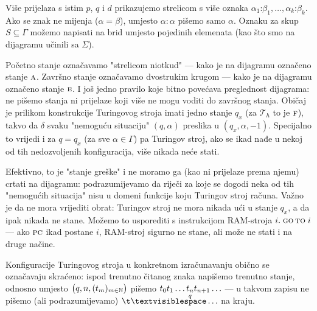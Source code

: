 \begin{primjer}[{name=[funkcija koja riječi parne duljine preslikava u prvu polovicu]}]
Više prijelaza s istim $p$, $q$ i $d$ prikazujemo strelicom s više oznaka $\alpha_1\mathord:\beta_1,\dotsc,\alpha_k\mathord:\beta_k$. Ako se znak ne mijenja ($\alpha=\beta$), umjesto $\alpha\!:\!\alpha$ pišemo samo $\alpha$. Oznaku za skup $S\subseteq\Gamma$ možemo napisati na brid umjesto pojedinih elemenata (kao što smo na dijagramu učinili sa $\Sigma$).

    Početno stanje označavamo "strelicom niotkud" --- kako je na dijagramu označeno stanje $\textsc a$. Završno stanje označavamo dvostrukim krugom --- kako je na dijagramu označeno stanje $\textsc e$. I još jedno pravilo koje bitno povećava preglednost dijagrama: ne pišemo stanja ni prijelaze koji više ne mogu voditi do završnog stanja. Običaj je prilikom konstrukcije Turingovog stroja imati jedno stanje $q_x$ (za $\mathcal T_h$ to je $\textsc f$), takvo da $\delta$ svaku "nemoguću situaciju" $(q,\alpha)$ preslika u $(q_x,\alpha,-1)$. Specijalno to vrijedi i za $q=q_x$ (za sve $\alpha\in\Gamma$) pa Turingov stroj, ako se ikad nađe u nekoj od tih nedozvoljenih konfiguracija, više nikada neće stati.

    Efektivno, to je "stanje greške" i ne moramo ga (kao ni prijelaze prema njemu) crtati na dijagramu: podrazumijevamo da riječi za koje se dogodi neka od tih "nemogućih situacija" nisu u domeni funkcije koju Turingov stroj računa. Važno je da ne mora vrijediti obrat: Turingov stroj ne mora nikada ući u stanje $q_x$, a da ipak nikada ne stane. Možemo to usporediti s instrukcijom RAM-stroja $i.\;\textsc{go\,to}\;i$ --- ako $\textsc{pc}$ ikad postane $i$, RAM-stroj sigurno ne stane, ali može ne stati i na druge načine.

    Konfiguracije Turingovog stroja u konkretnom izračunavanju obično se označavaju skraćeno: ispod trenutno čitanog znaka napišemo trenutno stanje, odnosno umjesto $\bigl(q,n,(t_m)_{m\in{\mathbb N}}\bigr)$ pišemo $t_0t_1\ldots\smash{\underset{q}{t_n}}t_{n+1}\ldots$ --- u takvom zapisu ne pišemo (ali podrazumijevamo) $\bl\ldots$ na kraju.


\end{primjer}
